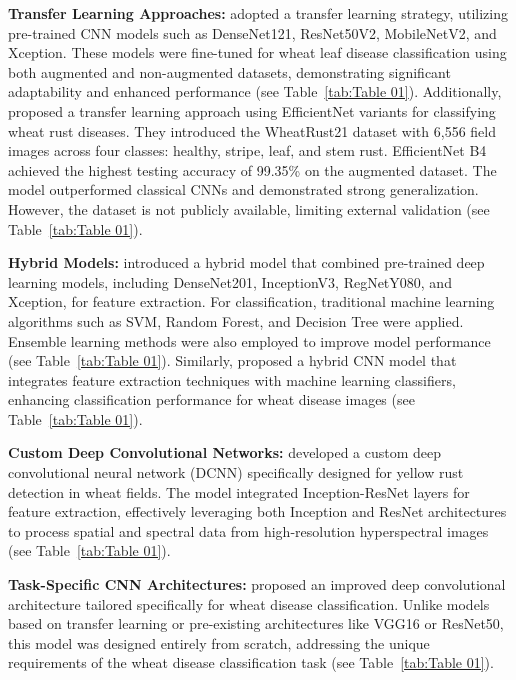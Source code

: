 \textbf{Transfer Learning Approaches:} \parencite{ramadan2024improving} adopted a transfer learning strategy, utilizing pre-trained CNN models such as DenseNet121, ResNet50V2, MobileNetV2, and Xception. These models were fine-tuned for wheat leaf disease classification using both augmented and non-augmented datasets, demonstrating significant adaptability and enhanced performance (see Table~\ref{tab:Table 01}). Additionally, \parencite{nigam2023deep} proposed a transfer learning approach using EfficientNet variants for classifying wheat rust diseases. They introduced the WheatRust21 dataset with 6,556 field images across four classes: healthy, stripe, leaf, and stem rust. EfficientNet B4 achieved the highest testing accuracy of 99.35\% on the augmented dataset. The model outperformed classical CNNs and demonstrated strong generalization. However, the dataset is not publicly available, limiting external validation (see Table~\ref{tab:Table 01}).


\textbf{Hybrid Models:} \parencite{reis2024integrated} introduced a hybrid model that combined pre-trained deep learning models, including DenseNet201, InceptionV3, RegNetY080, and Xception, for feature extraction. For classification, traditional machine learning algorithms such as SVM, Random Forest, and Decision Tree were applied. Ensemble learning methods were also employed to improve model performance (see Table~\ref{tab:Table 01}). Similarly, \parencite{goyal2021leaf} proposed a hybrid CNN model that integrates feature extraction techniques with machine learning classifiers, enhancing classification performance for wheat disease images (see Table~\ref{tab:Table 01}).

\textbf{Custom Deep Convolutional Networks:} \parencite{zhang2019deep} developed a custom deep convolutional neural network (DCNN) specifically designed for yellow rust detection in wheat fields. The model integrated Inception-ResNet layers for feature extraction, effectively leveraging both Inception and ResNet architectures to process spatial and spectral data from high-resolution hyperspectral images (see Table~\ref{tab:Table 01}).


\textbf{Task-Specific CNN Architectures:} \parencite{goyal2021leaf} proposed an improved deep convolutional architecture tailored specifically for wheat disease classification. Unlike models based on transfer learning or pre-existing architectures like VGG16 or ResNet50, this model was designed entirely from scratch, addressing the unique requirements of the wheat disease classification task (see Table~\ref{tab:Table 01}).


